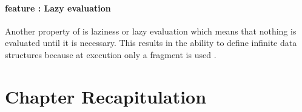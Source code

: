 \documentclass[thesis-solanki.tex]{subfiles}
\begin{document}
\paragraph{ feature : Lazy evaluation}
Another property of  is laziness or lazy evaluation which means that nothing is evaluated until
it is necessary.
This results in the ability to define infinite data structures because at execution only a fragment is used
\cite{website:haskelllazinesswiki}.







\section{Chapter Recapitulation}



\ifMain
\begin{scope}
  \nolinenumbers
  \enotesize
  \par
  \begin{singlespace}
  \setlength{\parskip}{12pt plus 2pt minus 1pt}
  \theendnotes
  \par
  \end{singlespace}
\end{scope}
\fi
\end{document}

